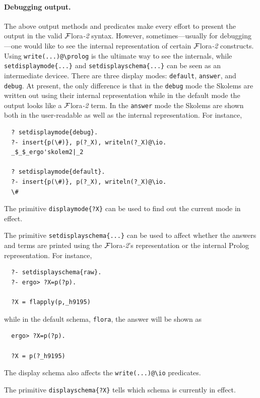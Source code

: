 \documentclass[11pt]{article}
\newcommand{\FLORA}{{\mbox{\sc ${\cal F}${lora}\rm\emph{-2}}}\xspace}
\newcommand{\FLSYSTEM}{\FLORA}
\newcommand{\bs}{\textbackslash}
\begin{document}
\paragraph{Debugging output.}
The above output methods and predicates make every effort to present the
output in the valid \FLSYSTEM syntax. However, sometimes---usually for
debugging---one would like to see the internal representation of certain
\FLSYSTEM constructs. Using \texttt{write(...)@\bs{}prolog} is the ultimate
way to see the internals, while \texttt{setdisplaymode\{...\}}
and \texttt{setdisplayschema\{...\}}  
can be seen as an intermediate devicee. There are three display modes:
\texttt{default}, \texttt{answer},  and \texttt{debug}.  At present, the only difference is
that in the \texttt{debug} mode
the Skolems are written out using their internal representation while in
the default mode the output looks like a \FLSYSTEM term. In the
\texttt{answer} mode the Skolems are shown
both in the user-readable as well as the internal representation. 
For instance,
\begin{verbatim}
  ? setdisplaymode{debug}.
  ?- insert{p(\#)}, p(?_X), writeln(?_X)@\io.
  _$_$_ergo'skolem2|_2

  ? setdisplaymode{default}.
  ?- insert{p(\#)}, p(?_X), writeln(?_X)@\io.
  \#
\end{verbatim}
The primitive \texttt{displaymode\{?X\}} can be used to find out the
current mode in effect. 

The primitive \texttt{setdisplayschema\{...\}} can be used to affect
whether the answers and terms are printed using the \FLSYSTEM's
representation or the internal Prolog representation. For instance,
\begin{verbatim}
  ?- setdisplayschema{raw}.
  ?- ergo> ?X=p(?p).

  ?X = flapply(p,_h9195)
\end{verbatim}
while in the default schema, \texttt{flora}, the answer will be shown as
\begin{verbatim}
  ergo> ?X=p(?p).

  ?X = p(?_h9195)
\end{verbatim}
The display schema also affects the \texttt{write(...)@\bs{}io} predicates. 

The primitive \texttt{displayschema\{?X\}} tells which schema is currently
in effect. 
\end{document}
